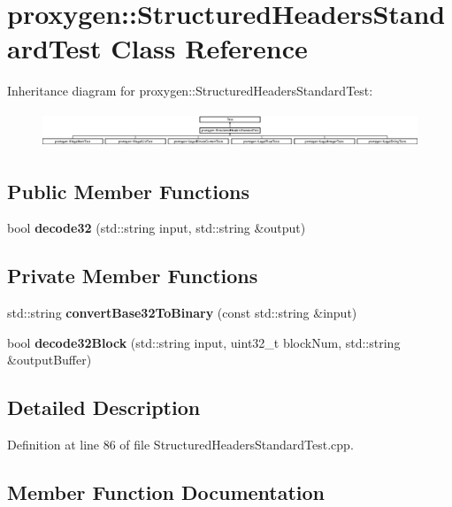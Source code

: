 \section{proxygen\+:\+:Structured\+Headers\+Standard\+Test Class Reference}
\label{classproxygen_1_1StructuredHeadersStandardTest}
Inheritance diagram for proxygen\+:\+:Structured\+Headers\+Standard\+Test\+:\begin{figure}[H]
\begin{center}
\leavevmode
\includegraphics[height=1.076923cm]{classproxygen_1_1StructuredHeadersStandardTest}
\end{center}
\end{figure}
\subsection*{Public Member Functions}
\begin{DoxyCompactItemize}
\item 
bool {\bf decode32} (std\+::string input, std\+::string \&output)
\end{DoxyCompactItemize}
\subsection*{Private Member Functions}
\begin{DoxyCompactItemize}
\item 
std\+::string {\bf convert\+Base32\+To\+Binary} (const std\+::string \&input)
\item 
bool {\bf decode32\+Block} (std\+::string input, uint32\+\_\+t block\+Num, std\+::string \&output\+Buffer)
\end{DoxyCompactItemize}


\subsection{Detailed Description}


Definition at line 86 of file Structured\+Headers\+Standard\+Test.\+cpp.



\subsection{Member Function Documentation}
